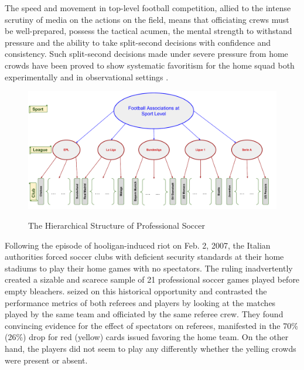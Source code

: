 \documentclass[USenglish]{article}
\begin{document}
The speed and movement in top-level football competition, allied to the intense scrutiny of media on the actions on the field, means that officiating crews must be well-prepared, possess the tactical acumen, the mental strength to withstand pressure and the ability to take split-second decisions with confidence and consistency. Such split-second decisions made under severe pressure from home crowds have been proved to show systematic favoritism for the home squad   
both experimentally \citep{Nevill1999, Nevill2002} and in observational settings \citep{Nevill1996, DOHMEN2008}.
\begin{figure}
\caption{The Hierarchical Structure of Professional Soccer }
{\includegraphics[width=1.0\linewidth]{HFA_22}}
\label{fig21}
\end{figure} 

Following the episode of hooligan-induced riot on Feb. 2, 2007, the Italian authorities forced soccer clubs with deficient security standards at their home stadiums to play their home games with no spectators. The ruling inadvertently created a sizable and scarece sample of 21 professional soccer games played before empty bleachers. \cite{Pettersson-Lidbom2010} seized on this historical opportunity and contrasted the performance metrics of both referees and players by looking at the matches played by the same team and officiated by the same referee crew. They found convincing evidence for the effect of spectators on referees, manifested in the 70\% (26\%) drop for red (yellow) cards issued favoring the home team. On the other hand, the players did not seem to play any differently whether the yelling crowds were present or absent. 
\end{document}
